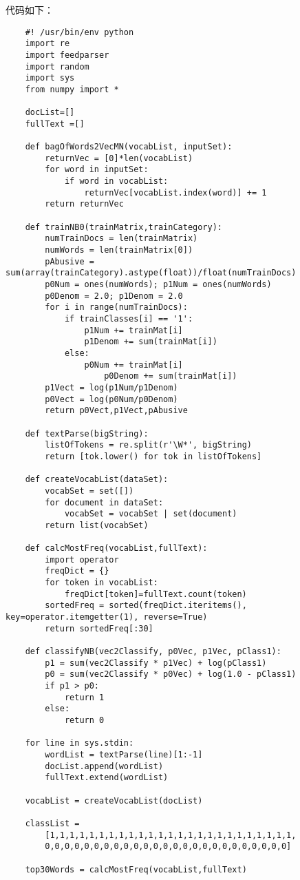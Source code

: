 代码如下：

\begin{lstlisting}
	#! /usr/bin/env python
	import re
	import feedparser
	import random
	import sys
	from numpy import *

	docList=[]
	fullText =[]
	
	def bagOfWords2VecMN(vocabList, inputSet):
	    returnVec = [0]*len(vocabList)
	    for word in inputSet:
	        if word in vocabList:
	            returnVec[vocabList.index(word)] += 1
	    return returnVec

	def trainNB0(trainMatrix,trainCategory):
	    numTrainDocs = len(trainMatrix)
	    numWords = len(trainMatrix[0])
	    pAbusive = sum(array(trainCategory).astype(float))/float(numTrainDocs)
	    p0Num = ones(numWords); p1Num = ones(numWords)
	    p0Denom = 2.0; p1Denom = 2.0
	    for i in range(numTrainDocs):
	        if trainClasses[i] == '1':
	            p1Num += trainMat[i]
	            p1Denom += sum(trainMat[i])
	        else:
	            p0Num += trainMat[i]
		            p0Denom += sum(trainMat[i])
	    p1Vect = log(p1Num/p1Denom)
	    p0Vect = log(p0Num/p0Denom)
	    return p0Vect,p1Vect,pAbusive

	def textParse(bigString):
	    listOfTokens = re.split(r'\W*', bigString)
	    return [tok.lower() for tok in listOfTokens]

	def createVocabList(dataSet):
	    vocabSet = set([])
	    for document in dataSet:
	        vocabSet = vocabSet | set(document)
	    return list(vocabSet)

	def calcMostFreq(vocabList,fullText):
	    import operator
	    freqDict = {}
	    for token in vocabList:
	        freqDict[token]=fullText.count(token)
	    sortedFreq = sorted(freqDict.iteritems(), key=operator.itemgetter(1), reverse=True)
	    return sortedFreq[:30]

	def classifyNB(vec2Classify, p0Vec, p1Vec, pClass1):
	    p1 = sum(vec2Classify * p1Vec) + log(pClass1)
	    p0 = sum(vec2Classify * p0Vec) + log(1.0 - pClass1)
	    if p1 > p0:
	        return 1
	    else:
	        return 0

	for line in sys.stdin:
	    wordList = textParse(line)[1:-1]
	    docList.append(wordList)
	    fullText.extend(wordList)

	vocabList = createVocabList(docList)

	classList = 
	    [1,1,1,1,1,1,1,1,1,1,1,1,1,1,1,1,1,1,1,1,1,1,1,1,1,
	    0,0,0,0,0,0,0,0,0,0,0,0,0,0,0,0,0,0,0,0,0,0,0,0,0]

	top30Words = calcMostFreq(vocabList,fullText)


\end{lstlisting}
